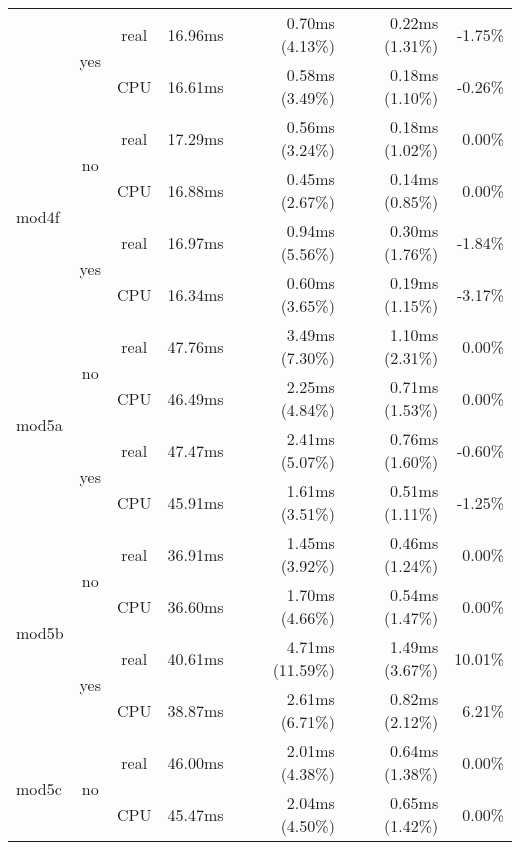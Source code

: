 \documentclass[en]{pracamgr}
\begin{document}
\begin{small}
\begin{longtable}{|l|c|c|r|r|r|r|}
                          \cline{2-7}
                          & \multirow{2}{*}{yes} & real & 16.96ms & 0.70ms (4.13\%) & 0.22ms (1.31\%) & -1.75\% \\*
                          &                      & CPU  & 16.61ms & 0.58ms (3.49\%) & 0.18ms (1.10\%) & -0.26\% \\
\hline
\multirow{4}{*}{mod4f}    & \multirow{2}{*}{no}  & real & 17.29ms & 0.56ms (3.24\%) & 0.18ms (1.02\%) & 0.00\% \\*
                          &                      & CPU  & 16.88ms & 0.45ms (2.67\%) & 0.14ms (0.85\%) & 0.00\% \\*
                          \cline{2-7}
                          & \multirow{2}{*}{yes} & real & 16.97ms & 0.94ms (5.56\%) & 0.30ms (1.76\%) & -1.84\% \\*
                          &                      & CPU  & 16.34ms & 0.60ms (3.65\%) & 0.19ms (1.15\%) & -3.17\% \\
\hline
\multirow{4}{*}{mod5a}    & \multirow{2}{*}{no}  & real & 47.76ms & 3.49ms (7.30\%) & 1.10ms (2.31\%) & 0.00\% \\*
                          &                      & CPU  & 46.49ms & 2.25ms (4.84\%) & 0.71ms (1.53\%) & 0.00\% \\*
                          \cline{2-7}
                          & \multirow{2}{*}{yes} & real & 47.47ms & 2.41ms (5.07\%) & 0.76ms (1.60\%) & -0.60\% \\*
                          &                      & CPU  & 45.91ms & 1.61ms (3.51\%) & 0.51ms (1.11\%) & -1.25\% \\
\hline
\multirow{4}{*}{mod5b}    & \multirow{2}{*}{no}  & real & 36.91ms & 1.45ms (3.92\%) & 0.46ms (1.24\%) & 0.00\% \\*
                          &                      & CPU  & 36.60ms & 1.70ms (4.66\%) & 0.54ms (1.47\%) & 0.00\% \\*
                          \cline{2-7}
                          & \multirow{2}{*}{yes} & real & 40.61ms & 4.71ms (11.59\%) & 1.49ms (3.67\%) & 10.01\% \\*
                          &                      & CPU  & 38.87ms & 2.61ms (6.71\%) & 0.82ms (2.12\%) & 6.21\% \\
\hline
\multirow{4}{*}{mod5c}    & \multirow{2}{*}{no}  & real & 46.00ms & 2.01ms (4.38\%) & 0.64ms (1.38\%) & 0.00\% \\*
                          &                      & CPU  & 45.47ms & 2.04ms (4.50\%) & 0.65ms (1.42\%) & 0.00\% \\*

\end{longtable}
\end{small}
\end{document}
